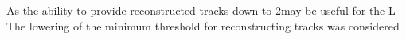
As the ability to provide reconstructed tracks down to 2\GeV may be useful for the L
The lowering of the minimum \pT threshold for reconstructing tracks was considered

